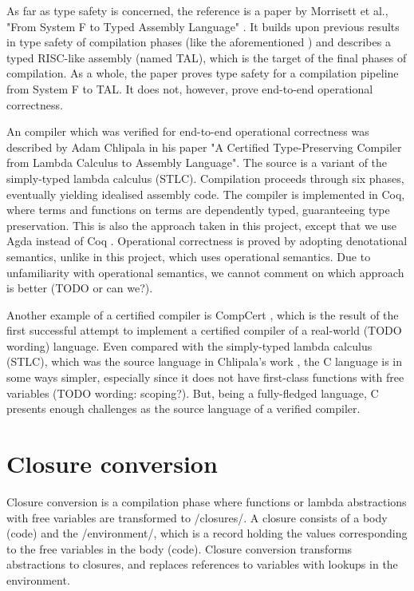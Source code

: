 \documentclass[bsc,frontabs,oneside,singlespacing,parskip,deptreport]{infthesis}
\theoremstyle{definition}
\theoremstyle{lemma}
\begin{document}
As far as type safety is concerned, the reference is a paper by
Morrisett et al., "From System F to Typed Assembly Language"
\cite{TODO}. It builds upon previous results in type safety of
compilation phases (like the aforementioned \cite{TCC}) and describes
a typed RISC-like assembly (named TAL), which is the target of the
final phases of compilation. As a whole, the paper proves type safety
for a compilation pipeline from System F to TAL. It does not, however,
prove end-to-end operational correctness.

An compiler which was verified for end-to-end operational
correctness was described by Adam Chlipala in his paper "A Certified
Type-Preserving Compiler from Lambda Calculus to Assembly
Language". The source is a variant of the simply-typed lambda calculus
(STLC). Compilation proceeds through six phases, eventually yielding
idealised assembly code. The compiler is implemented in Coq, where
terms and functions on terms are dependently typed, guaranteeing type
preservation. This is also the approach taken in this project, except
that we use Agda instead of Coq \cite{TODO}. Operational
correctness is proved by adopting denotational semantics, unlike in
this project, which uses operational semantics. Due to unfamiliarity
with operational semantics, we cannot comment on which approach is
better (TODO or can we?).

Another example of a certified compiler is CompCert
\cite{TODOcompcert}, which is the result of the first successful
attempt to implement a certified compiler of a real-world (TODO
wording) language. Even compared with the simply-typed lambda calculus
(STLC), which was the source language in Chlipala's work \cite{TODO},
the C language is in some ways simpler, especially since it does not
have first-class functions with free variables (TODO wording:
scoping?). But, being a fully-fledged language, C presents enough
challenges as the source language of a verified compiler.

\section{Closure conversion}

Closure conversion is a compilation phase where functions or lambda
abstractions with free variables are transformed to /closures/. A
closure consists of a body (code) and the /environment/, which is a
record holding the values corresponding to the free variables in the
body (code). Closure conversion transforms abstractions to closures,
and replaces references to variables with lookups in the environment.
\end{document}
